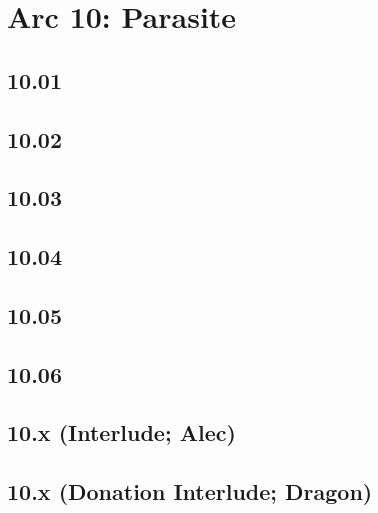 \part*{Arc 10: Parasite}
 \chapter*{10.01}
 \chapter*{10.02}
 \chapter*{10.03}
 \chapter*{10.04}
 \chapter*{10.05}
 \chapter*{10.06}
 \chapter*{10.x (Interlude; Alec)}
 \chapter*{10.x (Donation Interlude; Dragon)}









